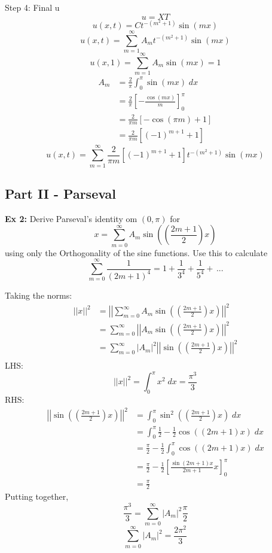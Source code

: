 \documentclass[12pt]{article}
\begin{document}
Step 4: Final u 
\[u = XT\]
\[u(x, t) = Ct^{-(m^2 + 1)}\sin(mx)\]
\[u(x, t) = \sum_{m=1}^\infty A_mt^{-(m^2 + 1)}\sin(mx)\]
\[u(x, 1) = \sum_{m=1}^\infty A_m \sin(mx) = 1\]
\begin{align*}
    A_m &= \frac{2}{\pi} \int_0^\pi \sin(mx) \; dx\\
    &= \frac{2}{\pi}\left[-\frac{\cos(mx)}{m}\right]_0^\pi\\
    &= \frac{2}{\pi m}\left[-\cos(\pi m)+ 1\right]\\
    & = \frac{2}{\pi m }[(-1)^{m+1} + 1]
\end{align*}
\[\boxed{u(x, t) = \sum_{m=1}^\infty \frac{2}{\pi m }\left[(-1)^{m+1} + 1\right]t^{-(m^2 + 1)}\sin(mx)}\]

\subsection*{Part II - Parseval}
\textbf{Ex 2:} Derive Parseval's identity om $(0, \pi)$ for 
\[x = \sum_{m=0}^\infty A_m \sin\left(\left(\frac{2m + 1}{2}\right)x\right)\]
using only the Orthogonality of the sine functions. 
Use this to calculate 
\[\sum_{m=0}^\infty \frac{1}{(2m + 1)^4} = 1 + \frac{1}{3^4} + \frac{1}{5^4} +\,...\]

Taking the norms:
\begin{align*}
    ||x||^2 &= \left|\left|\sum_{m=0}^\infty A_m \sin\left(\left(\frac{2m + 1}{2}\right)x\right)\right|\right|^2\\
    &= \sum_{m=0}^\infty \left|\left|A_m \sin\left(\left(\frac{2m + 1}{2}\right)x\right)\right|\right|^2\\
    &= \sum_{m=0}^\infty |A_m|^2 \left|\left|\sin\left(\left(\frac{2m + 1}{2}\right)x\right)\right|\right|^2\\
\end{align*}
LHS:
\[||x||^2 = \int_0^\pi x^2 \; dx = \frac{\pi^3}{3}\]
RHS:
\begin{align*}
    \left|\left|\sin\left(\left(\frac{2m + 1}{2}\right)x\right)\right|\right|^2 &= \int_0^\pi \sin^2\left(\left(\frac{2m + 1}{2}\right)x\right)\; dx\\
    &= \int_0^\pi \frac{1}{2} - \frac{1}{2}\cos((2m  +1)x)\; dx\\
    &= \frac{\pi}{2} - \frac{1}{2}\int_0^\pi \cos((2m + 1)x)\; dx\\
    &= \frac{\pi}{2} - \frac{1}{2}\left[\frac{\sin(2m + 1)x}{2m + 1}x\right]_0^\pi\\
    &= \frac{\pi}{2}
\end{align*}
Putting together, 
\[\frac{\pi^3}{3} = \sum_{m=0}^\infty |A_m|^2 \frac{\pi}{2}\]
\[\sum_{m=0}^\infty |A_m|^2 = \frac{2\pi^2}{3}\]
\end{document}

